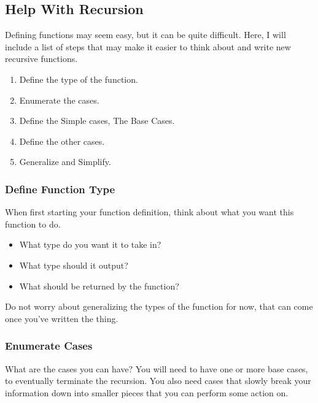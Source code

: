 \subsection{Help With Recursion}\label{subsec:Help_Recursion}
Defining  functions may seem easy, but it can be quite difficult.
Here, I will include a list of steps that may make it easier to think about and write new recursive functions.

\begin{enumerate}[noitemsep]
\item Define the type of the function. 
\item Enumerate the cases. 
\item Define the Simple cases, The Base Cases. 
\item Define the other cases. 
\item Generalize and Simplify. 
\end{enumerate}

\subsubsection{Define Function Type}\label{subsubsec:Help_Recursion-Function_Type}
When first starting your function definition, think about what you want this function to do.
\begin{itemize}[noitemsep]
\item What type do you want it to take in?
\item What type should it output?
\item What should be returned by the function?
\end{itemize}

Do not worry about generalizing the types of the function for now, that can come once you've written the thing.

\subsubsection{Enumerate Cases}\label{subsubsec:Help_Recursion-Enumerate_Cases}
What are the cases you can have?
You will need to have one or more base cases, to eventually terminate the recursion.
You also need cases that slowly break your information down into smaller pieces that you can perform some action on.

